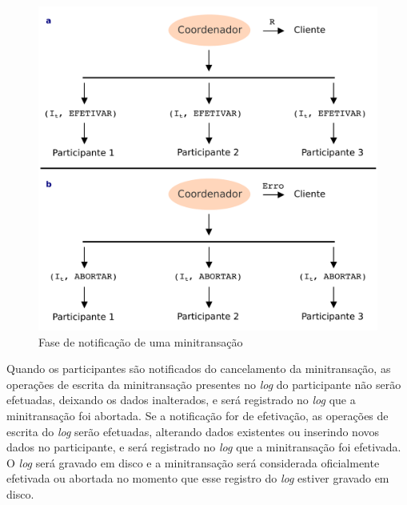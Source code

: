 \documentclass[11pt,twoside,a4paper]{book}
\begin{document}
\begin{figure}
  \centering
  \includegraphics[width=.65\textwidth]{minitransacao_2fase} 
  \caption{Fase de notificação de uma minitransação}
  \label{fig:minitransacao_2fase} 
\end{figure}

Quando os participantes são notificados do cancelamento da minitransação, as operações de escrita da minitransação presentes no \emph{log} do participante não serão efetuadas, deixando os dados inalterados, e será registrado no \emph{log} que a minitransação foi abortada. Se a notificação for de efetivação, as operações de escrita do \emph{log} serão efetuadas, alterando dados existentes ou inserindo novos dados no participante, e será registrado no \emph{log} que a minitransação foi efetivada. O \emph{log} será gravado em disco e a minitransação será considerada oficialmente efetivada ou abortada no momento que esse registro do \emph{log} estiver gravado em disco.





\end{document}
